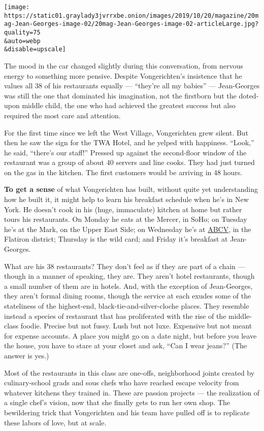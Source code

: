 \texttt{[image: https://static01.graylady3jvrrxbe.onion/images/2019/10/20/magazine/20mag-Jean-Georges-image-02/20mag-Jean-Georges-image-02-articleLarge.jpg?quality=75\\\&auto=webp\\\&disable=upscale]}

The mood in the car changed slightly during this conversation, from
nervous energy to something more pensive. Despite Vongerichten's
insistence that he values all 38 of his restaurants equally ---
``they're all my babies'' --- Jean-Georges was still the one that
dominated his imagination, not the firstborn but the doted-upon middle
child, the one who had achieved the greatest success but also required
the most care and attention.

For the first time since we left the West Village, Vongerichten grew
silent. But then he saw the sign for the TWA Hotel, and he yelped with
happiness. ``Look,'' he said, ``there's our staff!'' Pressed up against
the second-floor window of the restaurant was a group of about 40
servers and line cooks. They had just turned on the gas in the kitchen.
The first customers would be arriving in 48 hours.

\textbf{To get a sense} of what Vongerichten has built, without quite
yet understanding how he built it, it might help to learn his breakfast
schedule when he's in New York. He doesn't cook in his (huge,
immaculate) kitchen at home but rather tours his restaurants. On Monday
he eats at the Mercer, in SoHo; on Tuesday he's at the Mark, on the
Upper East Side; on Wednesday he's at
\href{https://www.nytimes3xbfgragh.onion/2017/07/03/dining/abcv-review-vegetables-restaurant-jean-georges-vongerichten.html}{ABCV},
in the Flatiron district; Thursday is the wild card; and Friday it's
breakfast at Jean-Georges.

What are his 38 restaurants? They don't feel as if they are part of a
chain --- though in a manner of speaking, they are. They aren't hotel
restaurants, though a small number of them are in hotels. And, with the
exception of Jean-Georges, they aren't formal dining rooms, though the
service at each exudes some of the stateliness of the highest-end,
black-tie-and-silver-cloche places. They resemble instead a species of
restaurant that has proliferated with the rise of the middle-class
foodie. Precise but not fussy. Lush but not luxe. Expensive but not
meant for expense accounts. A place you might go on a date night, but
before you leave the house, you have to stare at your closet and ask,
``Can I wear jeans?'' (The answer is yes.)

Most of the restaurants in this class are one-offs, neighborhood joints
created by culinary-school grads and sous chefs who have reached escape
velocity from whatever kitchens they trained in. These are passion
projects --- the realization of a single chef's vision, now that she
finally gets to run her own shop. The bewildering trick that
Vongerichten and his team have pulled off is to replicate these labors
of love, but at scale.

